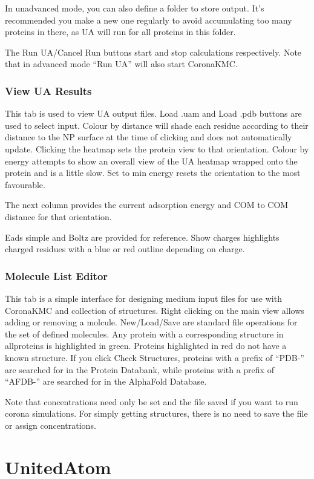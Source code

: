 \documentclass[10pt,a4paper,onecolumn]{report}
\begin{document}
In unadvanced mode, you can also define a folder to store output. It's recommended you make a new one regularly to avoid accumulating too many proteins in there, as UA will run for all proteins in this folder.

The Run UA/Cancel Run buttons start and stop calculations respectively. Note that in advanced mode ``Run UA'' will also start CoronaKMC.
\subsection{View UA Results}
This tab is used to view UA output files. Load .uam and Load .pdb buttons are used to select input. Colour by distance will shade each residue according to their distance to the NP surface at the time of clicking and does not automatically update. Clicking the heatmap sets the protein view to that orientation.
Colour by energy attempts to show an overall view of the UA heatmap wrapped onto the protein and is a little slow.
Set to min energy resets the orientation to the most favourable.

The next column provides the current adsorption energy and COM to COM distance for that orientation.

Eads simple and Boltz are provided for reference.
Show charges highlights charged residues with a blue or red outline depending on charge. 
\subsection{Molecule List Editor}
This tab is a simple interface for designing medium input files for use with CoronaKMC and collection of structures.
Right clicking on the main view allows adding or removing a molcule. New/Load/Save are standard file operations for the set of defined molecules.
Any protein with a corresponding structure in all\textunderscore proteins is highlighted in green. Proteins highlighted in red do not have a known structure.
If you click Check Structures, proteins with a prefix of ``PDB-'' are searched for in the Protein Databank, while proteins with a prefix of ``AFDB-'' are searched for in the AlphaFold Database.

Note that concentrations need only be set and the file saved if you want to run corona simulations. For simply getting structures, there is no need to save the file or assign concentrations. 

\chapter{UnitedAtom}
\end{document}
